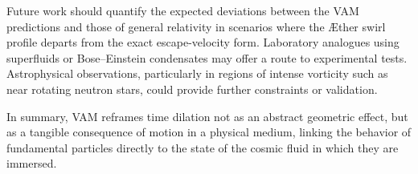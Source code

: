 \documentclass[11pt]{article}
\begin{document}
Future work should quantify the expected deviations between the VAM predictions and those of general relativity in scenarios where the Æther swirl profile departs from the exact escape-velocity form. Laboratory analogues using superfluids or Bose–Einstein condensates may offer a route to experimental tests. Astrophysical observations, particularly in regions of intense vorticity such as near rotating neutron stars, could provide further constraints or validation.

In summary, VAM reframes time dilation not as an abstract geometric effect, but as a tangible consequence of motion in a physical medium, linking the behavior of fundamental particles directly to the state of the cosmic fluid in which they are immersed.
\end{document}

